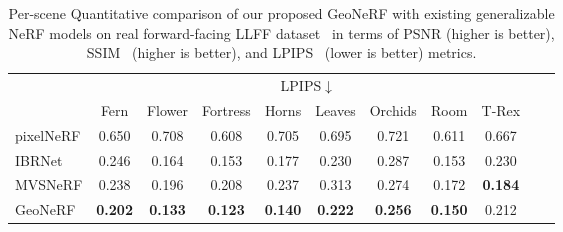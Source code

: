 \begin{table}[!t]
    \vspace{1.0ex}

    \begin{center}
        \begin{threeparttable}
            \begin{tabular}{l|cccccccccc}
            & \multicolumn{8}{c}{LPIPS$\downarrow$} \\
            &  Fern & Flower & Fortress & Horns & Leaves & Orchids & Room & T-Rex \\
            \hline
            pixelNeRF & 0.650 & 0.708 & 0.608 & 0.705 & 0.695 & 0.721 & 0.611 & 0.667 \\
            IBRNet & 0.246 & 0.164 & 0.153 & 0.177 & 0.230 & 0.287 & 0.153 & 0.230 \\
            MVSNeRF & 0.238 & 0.196 & 0.208 & 0.237 & 0.313 & 0.274 & 0.172 & \textbf{0.184} \\
            GeoNeRF & \textbf{0.202} & \textbf{0.133} & \textbf{0.123} & \textbf{0.140} & \textbf{0.222} & \textbf{0.256} & \textbf{0.150} & 0.212 \\
            \hline
            \end{tabular}
        \end{threeparttable}
    \end{center}
    \vspace{3ex}
    \caption{Per-scene Quantitative comparison of our proposed GeoNeRF with existing generalizable NeRF models on real forward-facing LLFF dataset~\cite{mildenhall2019llff} in terms of PSNR (higher is better), SSIM~\cite{wang2004image} (higher is better), and LPIPS~\cite{zhang2018unreasonable} (lower is better) metrics.}
    \label{table:per_scene_no_ft_llff}
\end{table}

\clearpage

